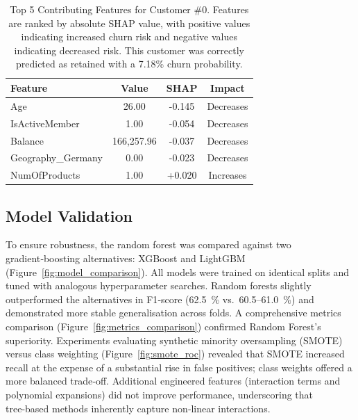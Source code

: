 \documentclass[12pt]{article}
\begin{document}
\begin{table}[H]
\centering
\small
\caption{Top 5 Contributing Features for Customer \#0. Features are ranked by absolute SHAP value, with positive values indicating increased churn risk and negative values indicating decreased risk. This customer was correctly predicted as retained with a 7.18\% churn probability.}
\label{tab:shap_top5}
\begin{tabular}{lccc}
\toprule
\textbf{Feature} & \textbf{Value} & \textbf{SHAP} & \textbf{Impact} \\
\midrule
Age & 26.00 & -0.145 & Decreases \\
IsActiveMember & 1.00 & -0.054 & Decreases \\
Balance & 166,257.96 & -0.037 & Decreases \\
Geography\_Germany & 0.00 & -0.023 & Decreases \\
NumOfProducts & 1.00 & +0.020 & Increases \\
\bottomrule
\end{tabular}
\end{table}

\subsection{Model Validation}
To ensure robustness, the random forest was compared against two gradient‑boosting alternatives: XGBoost and LightGBM (Figure~\ref{fig:model_comparison}).  All models were trained on identical splits and tuned with analogous hyperparameter searches.  Random forests slightly outperformed the alternatives in F1‑score (62.5~\% vs.\ 60.5–61.0~\%) and demonstrated more stable generalisation across folds.  A comprehensive metrics comparison (Figure~\ref{fig:metrics_comparison}) confirmed Random Forest's superiority.  Experiments evaluating synthetic minority oversampling (SMOTE) versus class weighting (Figure~\ref{fig:smote_roc}) revealed that SMOTE increased recall at the expense of a substantial rise in false positives; class weights offered a more balanced trade‑off.  Additional engineered features (interaction terms and polynomial expansions) did not improve performance, underscoring that tree‑based methods inherently capture non‑linear interactions.
\end{document}
